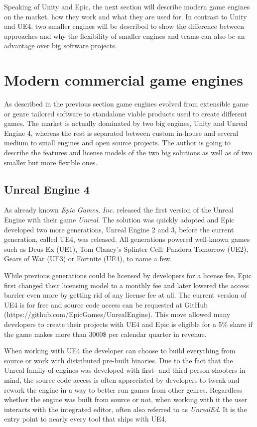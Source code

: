 Speaking of Unity and Epic, the next section will describe modern game engines on the market, how they work and what they are used for. In contrast to Unity and \acl{UE4}, two smaller engines will be described to show the difference between approaches and why the flexibility of smaller engines and teams can also be an advantage over big software projects.


\section{Modern commercial game engines}

As described in the previous section game engines evolved from extensible game or genre tailored software to standalone viable products used to create different games. The market is actually dominated by two big engines, Unity and Unreal Engine 4, whereas the rest is separated between custom in-house and several medium to small engines and open source projects. The author is going to describe the features and license models of the two big solutions as well as of two smaller but more flexible ones.

\subsection{Unreal Engine 4}

As already known \textit{Epic Games, Inc.} released the first version of the Unreal Engine with their game \textit{Unreal}. The solution was quickly adopted and Epic developed two more generations, Unreal Engine 2 and 3, before the current generation, called \ac{UE4}, was released. 
All generations powered well-known games such as Deus Ex (UE1), Tom Clancy’s Splinter Cell: Pandora Tomorrow (UE2), Gears of War (UE3) or Fortnite (UE4), to name a few.

While previous generations could be licensed by developers for a license fee, Epic first changed their licensing model to a monthly fee and later lowered the access barrier even more by getting rid of any license fee at all. The current version of \ac{UE4} is for free and source code access can be requested at GitHub (https://github.com/EpicGames/UnrealEngine). This move allowed many developers to create their projects with \ac{UE4} and Epic is eligible for a 5\% share if the game makes more than 3000\$ per calendar quarter in revenue.\cite{UE4_F}

When working with \ac{UE4} the developer can choose to build everything from source or work with distributed pre-built binaries. Due to the fact that the Unreal family of engines was developed with first- and third person shooters in mind, the source code access is often appreciated by developers to tweak and rework the engine in a way to better run games from other genres. Regardless whether the engine was built from source or not, when working with it the user interacts with the integrated editor, often also referred to as \textit{UnrealEd}. It is the entry point to nearly every tool that ships with \ac{UE4}.

